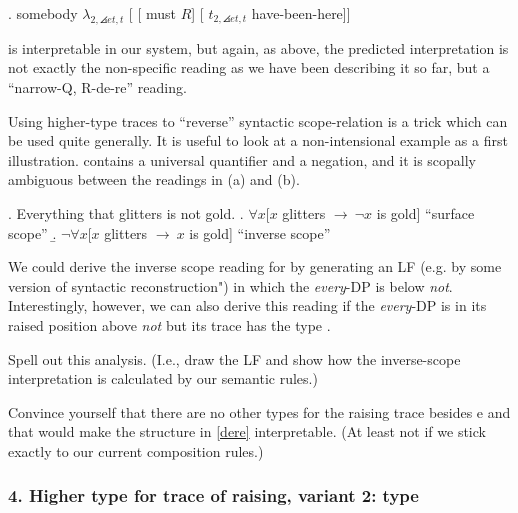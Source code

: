 \exi. somebody $\lambda_{2,\angles{et,t}}$ [ [ must $R$] [ $t_{2,\angles{et,t}}$ have-been-here]]

\Last is interpretable in our system, but again, as above, the predicted interpretation is not exactly the non-specific reading as we have been describing it so far, but a ``narrow-Q, R-de-re'' reading.
\begin{exercise}
	
	Using higher-type traces to ``reverse'' syntactic scope-relation is a trick which can be used quite generally. It is useful to look at a non-intensional example as a first illustration. \Next contains a universal quantifier and a negation, and it is scopally ambiguous between the readings in (a) and (b).
	
	\ex. Everything that glitters is not gold. \a. $\forall x[ x$ glitters $\rightarrow\ \ensuremath{\neg} x$ is gold] \hfill``surface scope'' \b. $\ensuremath{\neg}\forall x[ x$ glitters $\rightarrow\ x$ is gold] \hfill``inverse scope''
	
	We could derive the inverse scope reading for \Last by generating an LF (e.g. by some version of syntactic reconstruction") in which the \emph{every}-DP is below \emph{not}. Interestingly, however, we can also derive this reading if the \emph{every}-DP is in its raised position above \emph{not} but its trace has the type .
	
	Spell out this analysis. (I.e., draw the LF and show how the inverse-scope interpretation is calculated by our semantic rules.) \eex 
\end{exercise}
\begin{exercise}
	
	Convince yourself that there are no other types for the raising trace besides e and  that would make the structure in \ref{dere} interpretable. (At least not if we stick exactly to our current composition rules.) \eex 
\end{exercise}

\subsubsection{4. Higher type for trace of raising, variant 2: type }

